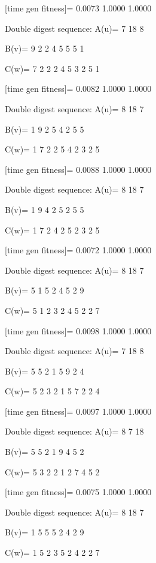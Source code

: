 [time gen fitness]=
    0.0073    1.0000    1.0000

Double digest sequence:
A(u)=
     7    18     8

B(v)=
     9     2     2     4     5     5     5     1

C(w)=
     7     2     2     2     4     5     3     2     5     1

[time gen fitness]=
    0.0082    1.0000    1.0000

Double digest sequence:
A(u)=
     8    18     7

B(v)=
     1     9     2     5     4     2     5     5

C(w)=
     1     7     2     2     5     4     2     3     2     5

[time gen fitness]=
    0.0088    1.0000    1.0000

Double digest sequence:
A(u)=
     8    18     7

B(v)=
     1     9     4     2     5     2     5     5

C(w)=
     1     7     2     4     2     5     2     3     2     5

[time gen fitness]=
    0.0072    1.0000    1.0000

Double digest sequence:
A(u)=
     8    18     7

B(v)=
     5     1     5     2     4     5     2     9

C(w)=
     5     1     2     3     2     4     5     2     2     7

[time gen fitness]=
    0.0098    1.0000    1.0000

Double digest sequence:
A(u)=
     7    18     8

B(v)=
     5     5     2     1     5     9     2     4

C(w)=
     5     2     3     2     1     5     7     2     2     4

[time gen fitness]=
    0.0097    1.0000    1.0000

Double digest sequence:
A(u)=
     8     7    18

B(v)=
     5     5     2     1     9     4     5     2

C(w)=
     5     3     2     2     1     2     7     4     5     2

[time gen fitness]=
    0.0075    1.0000    1.0000

Double digest sequence:
A(u)=
     8    18     7

B(v)=
     1     5     5     5     2     4     2     9

C(w)=
     1     5     2     3     5     2     4     2     2     7


